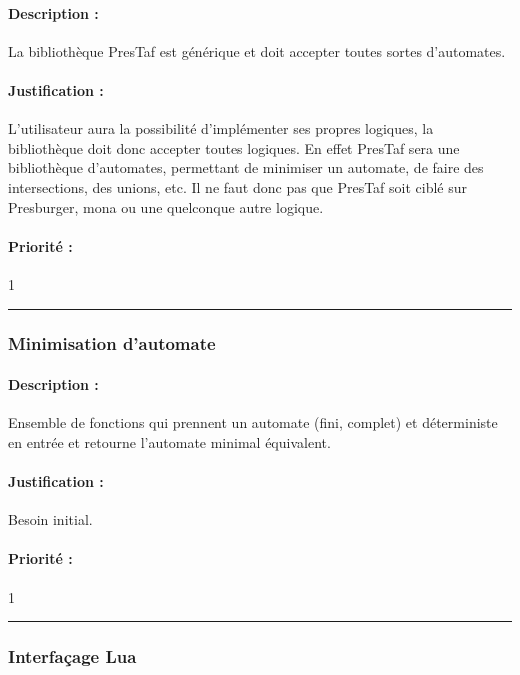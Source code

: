 \documentclass{article}%
\begin{document}
\paragraph{Description :} La bibliothèque PresTaf est générique et doit accepter toutes sortes d'automates.

\paragraph{Justification :} L'utilisateur aura la possibilité d'implémenter ses propres logiques, la bibliothèque doit donc accepter toutes logiques. En effet PresTaf sera une bibliothèque d'automates, permettant de minimiser un automate, de faire des intersections, des unions, etc. Il ne faut donc pas que PresTaf soit ciblé sur Presburger, mona ou une quelconque autre logique.

\paragraph{Priorité :} 1\\

\rule{\linewidth}{1pt}

\subsubsection{Minimisation d'automate}

\paragraph{Description :} Ensemble de fonctions qui prennent un automate (fini, complet) et déterministe en entrée et retourne l'automate minimal équivalent.

\paragraph{Justification :} Besoin initial.

\paragraph{Priorité :} 1\\

\rule{\linewidth}{1pt}

\subsubsection{Interfaçage Lua}
\end{document}
